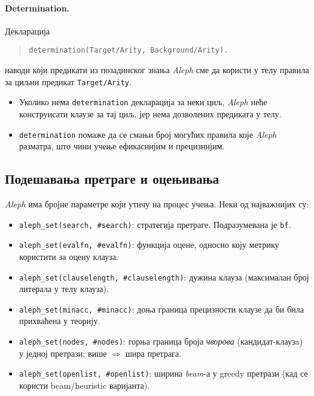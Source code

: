 \paragraph{Determination.}  
Декларација  
\begin{quote}
\verb|determination(Target/Arity, Background/Arity).|
\end{quote}
наводи који предикати из позадинског знања \emph{Aleph} сме да користи у телу правила за циљни предикат \verb|Target/Arity|.

\begin{itemize}
  \item Уколико нема \verb|determination| декларација за неки циљ, \emph{Aleph} неће конструисати клаузе за тај циљ, јер нема дозволених предиката у телу.  
  \item \verb|determination| помаже да се смањи број могућих правила које \emph{Aleph} разматра, што чини учење ефикаснијим и прецизнијим.
\end{itemize}

\subsection{Подешавања претраге и оцењивања}
\emph{Aleph} има бројне параметре који утичу на процес учења. Неки од најважнијих су:
\begin{itemize}
  \item \verb|aleph_set(search, #search)|: стратегија претраге. Подразумевана је \verb|bf|.
  \item \verb|aleph_set(evalfn, #evalfn)|: функција оцене, односно коју метрику користити за оцену клауза.
  \item \verb|aleph_set(clauselength, #clauselength)|: дужина клауза (максималан број литерала у телу клауза).
  \item \verb|aleph_set(minacc, #minacc)|: доња граница прецизности клаузе да би била прихваћена у теорију.
  \item \verb|aleph_set(nodes, #nodes)|: горња граница броја \emph{чворова} (кандидат-клаузa) у једној претрази; више \(\Rightarrow\) шира претрага.
  \item \verb|aleph_set(openlist, #openlist)|: ширина \emph{beam}-а у greedy претрази (кад се користи beam/heuristic варијанта). \cite{aleph_manual}
\end{itemize}

